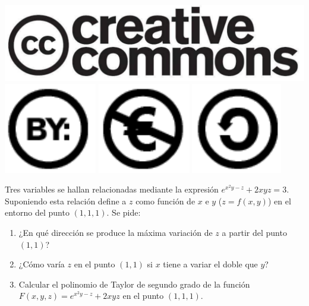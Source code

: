 \documentclass[aspectratio=149,10pt,xcolor=dvipsnames,t]{beamer}
\begin{document}
\begin{frame}[c]
\begin{center}
\biskip
\includegraphics[scale=0.07]{img/cc-logo}
\includegraphics[scale=0.2]{img/cc-by}
\includegraphics[scale=0.2]{img/cc-e}
\includegraphics[scale=0.2]{img/cc-c}
\end{center}
\end{frame}

\begin{frame}[c]
Tres variables se hallan relacionadas mediante la expresión $e^{x^2y-z}+2xyz=3$. 
Suponiendo esta relación define a $z$ como función de $x$ e $y$ ($z=f(x,y)$) en el entorno del punto $(1,1,1)$.
Se pide:
\begin{enumerate}
\item ¿En qué dirección se produce la máxima variación de $z$ a partir del punto $(1,1)$?
\item ¿Cómo varía $z$ en el punto $(1,1)$ si $x$ tiene a variar el doble que $y$?
\item Calcular el polinomio de Taylor de segundo grado de la función $F(x,y,z)=e^{x^2y-z}+2xyz$ en el punto $(1,1,1)$.
\end{enumerate}
\end{frame}
\end{document}
